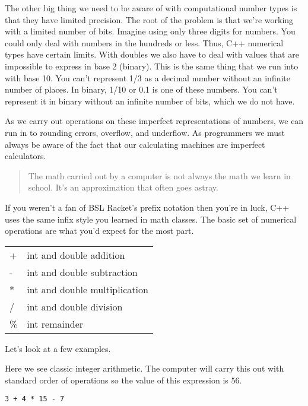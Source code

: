 \documentclass[]{tufte-handout}
\begin{document}
The other big thing we need to be aware of with computational number types is that they have limited precision. The root of the problem is that we're working with a limited number of bits. Imagine using only three digits for numbers.  You could only deal with numbers in the hundreds or less.  Thus, C++ numerical types have certain limits.  With doubles we also have to deal with values that are impossible to express in base 2 (binary).  This is the same thing that we run into with base 10. You can't represent 1/3 as a decimal number without an infinite number of places.  In binary, 1/10 or 0.1 is one of these numbers. You can't represent it in binary without an infinite number of bits, which we do not have. 

As we carry out operations on these imperfect representations of numbers, we can run in to rounding errors, overflow, and underflow. As programmers we must always be aware of the fact that our calculating machines are imperfect calculators.

\begin{quote}
The math carried out by a computer is not always the math we learn in school. It's an approximation that often goes astray.
\end{quote}

If you weren't a fan of BSL Racket's prefix notation then you're in luck, C++ uses the same infix style you learned in math classes.  The basic set of numerical operations are what you'd expect for the most part.
\begin{center}
\begin{tabular}{ll}
+ & int and double addition \\
- & int and double subtraction \\
* & int and double multiplication \\
/ & int and double division \\
\% & int remainder
\end{tabular}
\end{center}

Let's look at a few examples.

Here we see classic integer arithmetic. The computer will carry this out with standard order of operations so the value of this expression is $56$.
\begin{verbatim}
3 + 4 * 15 - 7
\end{verbatim}
\end{document}
